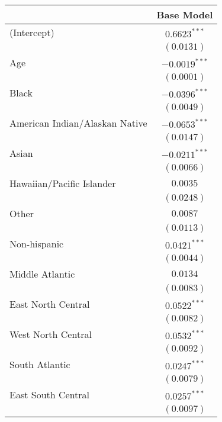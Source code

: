 \documentclass[letter]{article}
\begin{document}
\begin{table}
\begin{center}
\begin{tabular}{l c}
\hline
 & Base Model \\
\hline
(Intercept)                    & $0.6623^{***}$  \\
                               & $(0.0131)$      \\
Age                            & $-0.0019^{***}$ \\
                               & $(0.0001)$      \\
Black                          & $-0.0396^{***}$ \\
                               & $(0.0049)$      \\
American Indian/Alaskan Native & $-0.0653^{***}$ \\
                               & $(0.0147)$      \\
Asian                          & $-0.0211^{***}$ \\
                               & $(0.0066)$      \\
Hawaiian/Pacific Islander      & $0.0035$        \\
                               & $(0.0248)$      \\
Other                          & $0.0087$        \\
                               & $(0.0113)$      \\
Non-hispanic                   & $0.0421^{***}$  \\
                               & $(0.0044)$      \\
Middle Atlantic                & $0.0134$        \\
                               & $(0.0083)$      \\
East North Central             & $0.0522^{***}$  \\
                               & $(0.0082)$      \\
West North Central             & $0.0532^{***}$  \\
                               & $(0.0092)$      \\
South Atlantic                 & $0.0247^{***}$  \\
                               & $(0.0079)$      \\
East South Central             & $0.0257^{***}$  \\
                               & $(0.0097)$      \\

\end{tabular}
\end{center}
\end{table}
\end{document}
